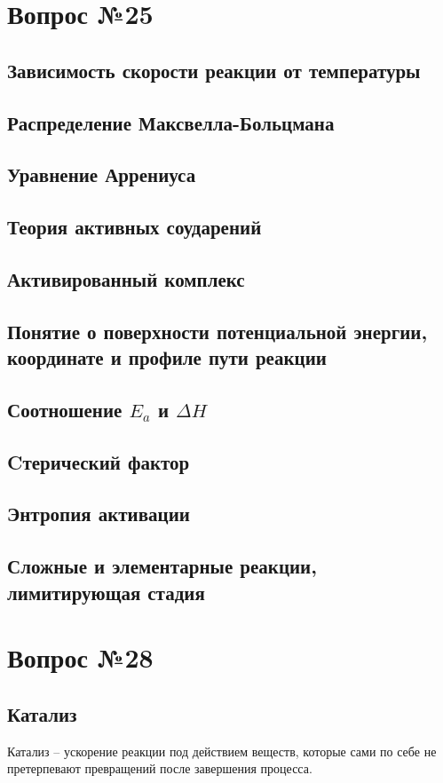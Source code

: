 \documentclass[14pt,a4paper]{scrartcl}
\begin{document}
\section*{Вопрос №25}

\subsection*{Зависимость скорости реакции от температуры}
\subsection*{Распределение Максвелла-Больцмана}
\subsection*{Уравнение Аррениуса}
\subsection*{Теория активных соударений}
\subsection*{Активированный комплекс}
\subsection*{Понятие о поверхности потенциальной энергии, координате и профиле пути реакции}
\subsection*{Соотношение $E_a$ и $\Delta{H}$}
\subsection*{Cтерический фактор}
\subsection*{Энтропия активации}
\subsection*{Сложные и элементарные реакции, лимитирующая стадия}	



\section*{Вопрос №28}
\subsection*{Катализ}
Катализ -- ускорение реакции под действием веществ, которые сами по себе не претерпевают превращений после завершения процесса.
\end{document}
